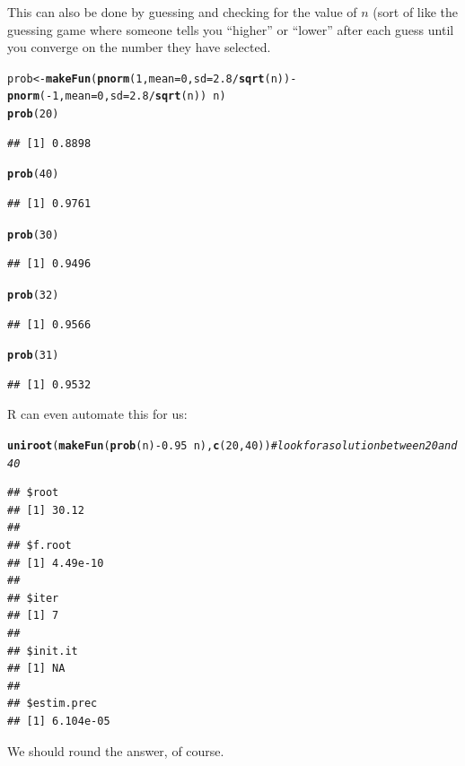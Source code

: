 \documentclass[twoside]{book}\usepackage[]{graphicx}\usepackage[]{xcolor}
\makeatletter
\newcommand{\hlnum}[1]{\textcolor[rgb]{0.686,0.059,0.569}{#1}}%
\newcommand{\hlcom}[1]{\textcolor[rgb]{0.678,0.584,0.686}{\textit{#1}}}%
\newcommand{\hlopt}[1]{\textcolor[rgb]{0,0,0}{#1}}%
\newcommand{\hlstd}[1]{\textcolor[rgb]{0.345,0.345,0.345}{#1}}%
\newcommand{\hlkwb}[1]{\textcolor[rgb]{0.69,0.353,0.396}{#1}}%
\newcommand{\hlkwc}[1]{\textcolor[rgb]{0.333,0.667,0.333}{#1}}%
\newcommand{\hlkwd}[1]{\textcolor[rgb]{0.737,0.353,0.396}{\textbf{#1}}}%
\newenvironment{kframe}{%
 \def\at@end@of@kframe{}%
 \ifinner\ifhmode%
  \def\at@end@of@kframe{\end{minipage}}%
  \begin{minipage}{\columnwidth}%
 \fi\fi%
 \def\FrameCommand##1{\hskip\@totalleftmargin \hskip-\fboxsep
 \colorbox{shadecolor}{##1}\hskip-\fboxsep
     \hskip-\linewidth \hskip-\@totalleftmargin \hskip\columnwidth}%
 \MakeFramed {\advance\hsize-\width
   \@totalleftmargin\z@ \linewidth\hsize
   \@setminipage}}%
 {\par\unskip\endMakeFramed%
 \at@end@of@kframe}
\newenvironment{knitrout}{}{} %
\makeatother
\begin{document}
\begin{solution}
\begin{enumerate}
			 This can also be done by guessing and checking for the value of $n$ (sort of like the 
			 guessing game where someone tells you ``higher'' or ``lower'' after each guess until 
			 you converge on the number they have selected.
\begin{knitrout}
\color{fgcolor}\begin{kframe}
\begin{alltt}
\hlstd{prob} \hlkwb{<-} \hlkwd{makeFun}\hlstd{(}\hlkwd{pnorm}\hlstd{(}\hlnum{1}\hlstd{,} \hlkwc{mean} \hlstd{=} \hlnum{0}\hlstd{,} \hlkwc{sd} \hlstd{=} \hlnum{2.8}\hlopt{/}\hlkwd{sqrt}\hlstd{(n))} \hlopt{-} \hlkwd{pnorm}\hlstd{(}\hlopt{-}\hlnum{1}\hlstd{,} \hlkwc{mean} \hlstd{=} \hlnum{0}\hlstd{,} \hlkwc{sd} \hlstd{=} \hlnum{2.8}\hlopt{/}\hlkwd{sqrt}\hlstd{(n))} \hlopt{~} \hlstd{n)}
\hlkwd{prob}\hlstd{(}\hlnum{20}\hlstd{)}
\end{alltt}
\begin{verbatim}
## [1] 0.8898
\end{verbatim}
\begin{alltt}
\hlkwd{prob}\hlstd{(}\hlnum{40}\hlstd{)}
\end{alltt}
\begin{verbatim}
## [1] 0.9761
\end{verbatim}
\begin{alltt}
\hlkwd{prob}\hlstd{(}\hlnum{30}\hlstd{)}
\end{alltt}
\begin{verbatim}
## [1] 0.9496
\end{verbatim}
\begin{alltt}
\hlkwd{prob}\hlstd{(}\hlnum{32}\hlstd{)}
\end{alltt}
\begin{verbatim}
## [1] 0.9566
\end{verbatim}
\begin{alltt}
\hlkwd{prob}\hlstd{(}\hlnum{31}\hlstd{)}
\end{alltt}
\begin{verbatim}
## [1] 0.9532
\end{verbatim}
\end{kframe}
\end{knitrout}
R can even automate this for us:
\begin{knitrout}
\color{fgcolor}\begin{kframe}
\begin{alltt}
\hlkwd{uniroot}\hlstd{(}\hlkwd{makeFun}\hlstd{(}\hlkwd{prob}\hlstd{(n)} \hlopt{-} \hlnum{0.95} \hlopt{~} \hlstd{n),} \hlkwd{c}\hlstd{(}\hlnum{20}\hlstd{,} \hlnum{40}\hlstd{))}  \hlcom{# look for a solution between 20 and 40}
\end{alltt}
\begin{verbatim}
## $root
## [1] 30.12
## 
## $f.root
## [1] 4.49e-10
## 
## $iter
## [1] 7
## 
## $init.it
## [1] NA
## 
## $estim.prec
## [1] 6.104e-05
\end{verbatim}
\end{kframe}
\end{knitrout}
We should round the answer, of course.
	\end{enumerate}
\end{solution}
\end{document}

